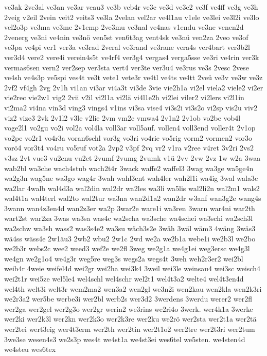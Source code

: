 {ve3ak
2ve3al
ve3an
ve3ar
veau3
ve3b
veb4r
ve3c
ve3d
ve3e2
ve3f
ve4ff
ve3g
ve3h
2veig
v2eil
2vein
veit2
veits3
ve3la
2velan
vel2ar
ve4l1au
v1ele
ve3lei
ve3l2i
ve3lo
vel2o3p
ve3ma
ve3me
2v1emp
2ve3mu
ve3nal
ve4nas
v1endu
ve3ne
venen2d
2venerg
ve3ni
ve4nin
ve3nö
ven5st
ven6t3ag
vent4sk
ve3nü
ven2za
2veo
ve3of
ve3pa
ve4pi
ver1
ver3a
ve3rad
2veral
ve3rand
ve3rane
vera4s
ver4bart
ver3b2l
ver3d4
vere2
vere4i
verein4s5t
ve4rf4
ver3g4
vergas4
verga5sse
ve3ri
ve4rin
ver3k
vermas6sen
vern2
ver2sep
ver3sta
vert4
ver3te
ver3u4
ve3rus
ve3s
2vesc
2vese
ve4sh
ve4s3p
ve5spi
ves4t
ve3t
vete1
vete3r
ve4tl
ve4ts
ve4tt
2veü
ve3v
ve3w
ve3z
2vf2
vf4gh
2vg
2v1h
vi1an
vi3ar
vi4a3t
vi3de
3vie
vie2h1a
vi2el
viela2
viele2
vi2er
vie2rec
vie2w1
vig2
2vii
v2il
vi2l1a
vi2lä
vi4l1e2h
vi2lei
viler2
vi2lers
vi2l1in
vi2ma2
vi4na
vin3d
ving3
vings4
v1ins
vi3sa
vise4
vi3s2i
vi3s2o
vi2sp
vis2u
viv2
viz2
vize3
2vk
2v1l2
v3le
v2lie
2vm
vm2e
vmwa4
2v1n2
2v1ob
vo2be
vob4l
voge2l1
vo2gu
vo2i
vol2a
vol4la
voll3ar
voll5auf.
vollen4
voll3end
voller4t
2v1op
vo2pe
vo2r1
vo4r3a
voran6schl
vor3g
vo3ri
vo4rie
vo5rig
vorm2
vormen2
vor3o
vorö4
vor3t4
vo4ru
vo5ruf
vot2a
2vp2
v3pf
2vq
vr2
v1ra
v2ree
v4ret
3v2ri
2vs2
v3sz
2vt
vue3
vu2enu
vu2et
2vumf
2vumg
2vumk
v1ü
2vv
2vw
2vz
1w
w2a
3waa
wab2bl
wa3che
wach4stub
wach2t4r
3wack
waffe2
waffel3
3wag
wa3ge
wa5ge4n
wa2g3n
wag5ne
wa3go
wag4r
3wah
wahl3ent
wah4ler
wah2l1i
wa4ig
3wal
wala3c
wa2lar
4walb
wal4d3a
wal2din
wal2dr
wa2les
wa3li
wa5lis
wal2li2n
wal2m1
wals2
wal4t1a
wal4terl
wal2to
wal2tur
wa3na
wan2d1a2
wan2dr
w3anf
wan3g2e
wang4s
3wann
wan4z3en4d
wan2z3er
wa2p
3war2e
ware1i
wa3ren
3warn
war4ni
war2th
wart2st
war2za
3was
wa3sa
was4c
wa2scha
wa3sche
wa4schei
wa3schi
wa2sch3l
wa2schw
wa3sh
wass2
was3s4e2
wa3su
wäch3s2e
3wäh
3wäl
wäm3
4wäng
3wäs3
wä4ss
wäss4e
2w1äu3
2wb2
wbu2
2w1c
2wd
we2a
we2b1a
webe1i
we2b3l
we2bo
we2b3r
webs2c
wee2
weed3
wef2e
we2fl
3weg
we2g1a
we4g1ei
weg3ersc
we4g3l
we4gn
we2g1o4
we4g3r
weg5re
weg3s
wegs2a
wegs4t
3weh
weh2r3er2
wei2bl
weib4r
4weie
weifel4d
wei2gr
wei2ha
wei3k4
3weil
wei3le
weinsau4
wei3sc
weisch4
wei2t1r
wei5ze
wel5le4
wel4schl
wel4schr
wel2t1
wel4t3a2
welte4
wel4t3en4d
wel4th
welt3i
welt3r
wem2ma2
wen3a2
wen2gl
we3n2i
wen2kau
wen2kla
wen2k3ri
we2r3a2
wer5be
werbe3i
wer2bl
werb2s
wer3d2
3werdens
3werdu
werer2
wer2fl
wer2ga
wer2gel
wer2g3o
wer2gr
werin2
we3rins
we2ri4o
3werk.
wer4k1a
3werke
wer2ki
wer2k3l
wer2kn
wer2k3o
wer2k3re
wer2ku
we2rö
wer2sta
wer2t1a
wer2tä
wer2tei
wert3eig
wer4t3erm
wer2th
wer2tin
wer2t1o2
wer2tre
wer2t3ri
wer2tum
3we3se
wesen4s3
we2s3p
wes4t
we4st1a
we4st3ei
wes6tel
we5sten.
we4sten4d
we4steu
wes6tex
}
